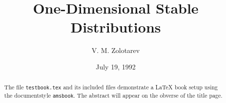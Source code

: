 
\newtheorem{thm}{Theorem}[section]
\newtheorem{cor}[thm]{Corollary}
\newtheorem{lem}[thm]{Lemma}


\title{One-Dimensional Stable Distributions}
\author{V. M. Zolotarev}
\address{Faculty of Mathematics and Statistics, Moscow State
University, Moscow, USSR}
\date{July 19, 1992}
\maketitle

\begin{abstract}
The file {\tt testbook.tex} and its included files demonstrate
a \LaTeX{} book setup using the documentstyle {\tt amsbook}.
The abstract will appear on the obverse of the 
title page.
\end{abstract}

\tableofcontents










